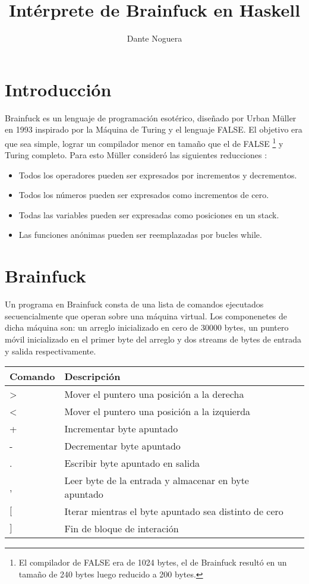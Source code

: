 \documentclass[a4paper, 12pt]{article}
\title{Int\'erprete de Brainfuck en Haskell}
\author{Dante Noguera}
\date{}
\begin{document}
\section*{Introducción}

Brainfuck es un lenguaje de programación esotérico, diseñado por Urban Müller en 1993 inspirado por la Máquina de Turing y el lenguaje FALSE.
El objetivo era que sea simple, lograr un compilador menor en tamaño que el de FALSE \footnote{El compilador de FALSE era de 1024 bytes, el de Brainfuck resultó en un tamaño de 240 bytes luego reducido a 200 bytes.} y Turing completo. 
Para esto Müller consideró las siguientes reducciones \cite{y}:
\begin{itemize}
	\item Todos los operadores pueden ser expresados por incrementos y decrementos.
	\item Todos los números pueden ser expresados como incrementos de cero.
	\item Todas las variables pueden ser expresadas como posiciones en un stack.
	\item Las funciones anónimas pueden ser reemplazadas por bucles while.
\end{itemize}


\section*{Brainfuck}

Un programa en Brainfuck consta de una lista de comandos ejecutados secuencialmente que operan sobre una máquina virtual. Los componenetes de dicha máquina son: un arreglo inicializado en cero de 30000 bytes, un puntero móvil inicializado en el primer byte del arreglo y dos streams de bytes de entrada y salida respectivamente.

\begin{center}
\begin{tabular}{ |l|l|l| } 
 \hline
 Comando & Descripción \\
 \hline
 \textgreater & Mover el puntero una posición a la derecha \\ 
 \textless & Mover el puntero una posición a la izquierda \\ 
 + & Incrementar byte apuntado \\ 
 - & Decrementar byte apuntado \\ 
 . & Escribir byte apuntado en salida\\ 
 , & Leer byte de la entrada y almacenar en byte apuntado \\ 
 $[$ & Iterar mientras el byte apuntado sea distinto de cero \\ 
 $]$ & Fin de bloque de interación \\ 
 \hline
\end{tabular}
\end{center}
\end{document}
